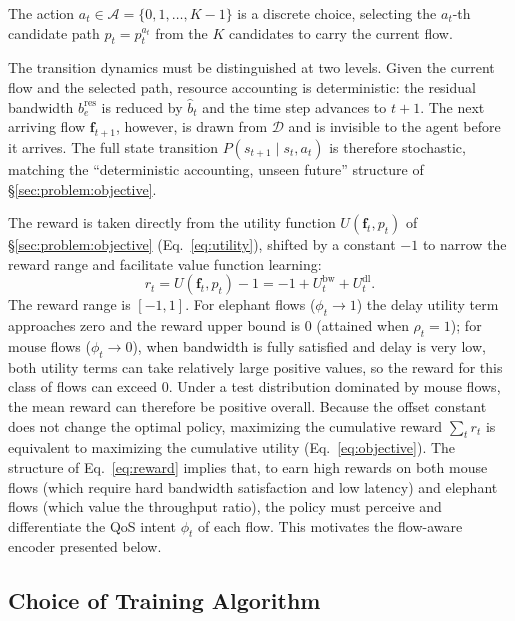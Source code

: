 The action $a_t\in\mathcal{A}=\{0,1,\dots,K-1\}$ is a discrete choice, selecting the $a_t$-th candidate path $p_t=p_t^{a_t}$ from the $K$ candidates to carry the current flow.

The transition dynamics must be distinguished at two levels. Given the current flow and the selected path, resource accounting is deterministic: the residual bandwidth $b_e^{\text{res}}$ is reduced by $\hat b_t$ and the time step advances to $t+1$. The next arriving flow $\mathbf{f}_{t+1}$, however, is drawn from $\mathcal{D}$ and is invisible to the agent before it arrives. The full state transition $P(s_{t+1}\mid s_t,a_t)$ is therefore stochastic, matching the ``deterministic accounting, unseen future'' structure of \S\ref{sec:problem:objective}.

The reward is taken directly from the utility function $U(\mathbf{f}_t,p_t)$ of \S\ref{sec:problem:objective} (Eq.~\eqref{eq:utility}), shifted by a constant $-1$ to narrow the reward range and facilitate value function learning:
\begin{equation}
r_t = U(\mathbf{f}_t, p_t) - 1
    = -1 + U^{\text{bw}}_t + U^{\text{dl}}_t.
\label{eq:reward}
\end{equation}
The reward range is $[-1, 1]$. For elephant flows ($\phi_t\to 1$) the delay utility term approaches zero and the reward upper bound is $0$ (attained when $\rho_t=1$); for mouse flows ($\phi_t\to 0$), when bandwidth is fully satisfied and delay is very low, both utility terms can take relatively large positive values, so the reward for this class of flows can exceed $0$. Under a test distribution dominated by mouse flows, the mean reward can therefore be positive overall. Because the offset constant does not change the optimal policy, maximizing the cumulative reward $\sum_t r_t$ is equivalent to maximizing the cumulative utility (Eq.~\eqref{eq:objective}). The structure of Eq.~\eqref{eq:reward} implies that, to earn high rewards on both mouse flows (which require hard bandwidth satisfaction and low latency) and elephant flows (which value the throughput ratio), the policy must perceive and differentiate the QoS intent $\phi_t$ of each flow. This motivates the flow-aware encoder presented below.

\subsection{Choice of Training Algorithm}
\label{sec:method:algo}

